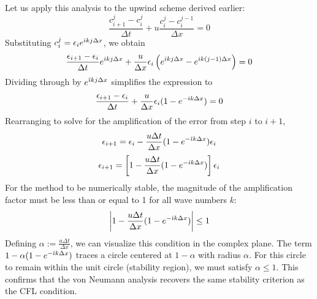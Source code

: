 Let us apply this analysis to the upwind scheme derived earlier:
\begin{equation}
    \frac{c_{i+1}^j - c_i^j}{\Delta t} + u \frac{c_i^j - c_i^{j-1}}{\Delta x} = 0
\end{equation}
Substituting $c_i^j = \epsilon_i e^{\hat{\imath} k j \Delta x}$, we obtain
\begin{equation}
    \frac{\epsilon_{i+1} - \epsilon_i}{\Delta t} e^{\hat{\imath} k j \Delta x} + \frac{u}{\Delta x} \epsilon_i \left( e^{\hat{\imath} k j \Delta x} - e^{\hat{\imath} k (j-1) \Delta x} \right) = 0
\end{equation}
Dividing through by $e^{\hat{\imath} k j \Delta x}$ simplifies the expression to
\begin{equation}
    \frac{\epsilon_{i+1} - \epsilon_i}{\Delta t} + \frac{u}{\Delta x} \epsilon_i (1 - e^{-\hat{\imath} k \Delta x}) = 0
\end{equation}
Rearranging to solve for the amplification of the error from step $i$ to $i+1$,
\begin{equation}
    \epsilon_{i+1} = \epsilon_i - \frac{u \Delta t}{\Delta x} (1 - e^{-\hat{\imath} k \Delta x}) \epsilon_i
\end{equation}
\begin{equation}
    \epsilon_{i+1} = \left[ 1 - \frac{u \Delta t}{\Delta x} (1 - e^{-\hat{\imath} k \Delta x}) \right] \epsilon_i
\end{equation}
For the method to be numerically stable, the magnitude of the amplification factor must be less than or equal to 1 for all wave numbers $k$:
\begin{equation}
    \left| 1 - \frac{u \Delta t}{\Delta x} (1 - e^{-\hat{\imath} k \Delta x}) \right| \le 1
\end{equation}
Defining $\alpha := \frac{u \Delta t}{\Delta x}$, we can visualize this condition in the complex plane. The term $1 - \alpha(1 - e^{-\hat{\imath} k \Delta x})$ traces a circle centered at $1-\alpha$ with radius $\alpha$. For this circle to remain within the unit circle (stability region), we must satisfy $\alpha \le 1$. This confirms that the von Neumann analysis recovers the same stability criterion as the CFL condition.


